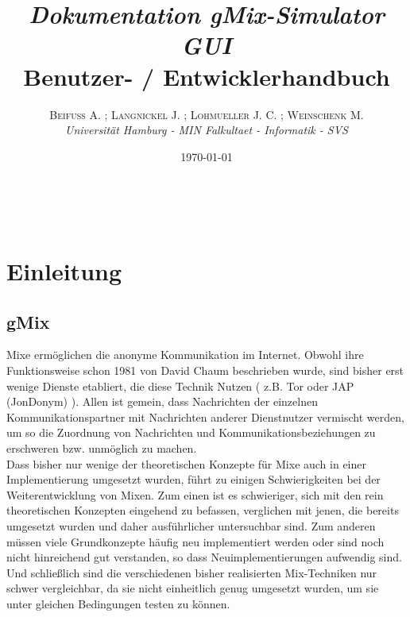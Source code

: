 \documentclass[a4paper, 11pt]{article} %
\title{\emph{Dokumentation gMix-Simulator GUI}\\ %
Benutzer- / Entwicklerhandbuch} %
\author{\textsc{Beifuß A. ; Langnickel J. ; Lohmueller J. C. ; Weinschenk M.} %
\\{\textit{Universität Hamburg - MIN Falkultaet - Informatik - SVS}}} %
\date{\today} %
\makeatletter
\renewcommand{\maketitle}{ %
\begin{flushright} %
{\LARGE\@title} %

\vspace{50pt} %

{\large\@author} %
\\\@date %

\vspace{40pt} %
\end{flushright}
}
\makeatother
\begin{document}
\maketitle %

 


\newpage
\tableofcontents


\vspace{30pt} %

\newpage
\section{Einleitung} %
\label{sec:einleitung}

\subsection{gMix} %
\label{sub:gmix}
Mixe ermöglichen die anonyme Kommunikation im Internet. Obwohl ihre Funktionsweise schon 1981 von David Chaum \cite{Cha81} beschrieben wurde, sind bisher erst wenige Dienste etabliert, die diese Technik Nutzen ( z.B. Tor \cite{DMS04} oder JAP (JonDonym) \cite{BFK01}). Allen ist gemein, dass Nachrichten der einzelnen Kommunikationspartner mit Nachrichten anderer Dienstnutzer vermischt werden, um so die Zuordnung von Nachrichten und Kommunikationsbeziehungen zu erschweren bzw. unmöglich zu machen.
\\

Dass bisher nur wenige der theoretischen Konzepte für Mixe auch in einer Implementierung umgesetzt wurden, führt zu einigen Schwierigkeiten bei der Weiterentwicklung von Mixen. Zum einen ist es schwieriger, sich mit den rein theoretischen Konzepten eingehend zu befassen, verglichen mit jenen, die bereits umgesetzt wurden und daher ausführlicher untersuchbar sind. Zum anderen müssen viele Grundkonzepte häufig neu implementiert werden oder sind noch nicht hinreichend gut verstanden, so dass Neuimplementierungen aufwendig sind. Und schließlich sind die verschiedenen bisher realisierten Mix-Techniken nur schwer vergleichbar, da sie nicht einheitlich genug umgesetzt wurden, um sie unter gleichen Bedingungen testen zu können.
\\
\end{document}
